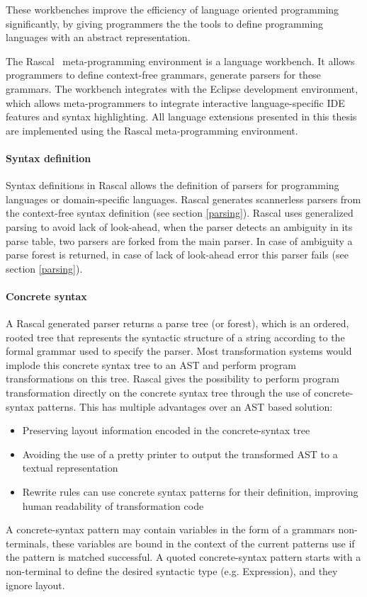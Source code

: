 These workbenches improve the efficiency of language oriented programming~\cite{Ward1994} significantly, by giving programmers the the tools to define programming languages with an abstract representation.

The Rascal~\cite{Klinta} meta-programming environment is a language workbench. It allows programmers to define context-free grammars, generate parsers for these grammars. The workbench integrates with the Eclipse development environment, which allows meta-programmers to integrate interactive language-specific IDE features and syntax highlighting. All language extensions presented in this thesis are implemented using the Rascal meta-programming environment.

\paragraph{Syntax definition}
Syntax definitions in Rascal allows the definition of parsers for programming languages or domain-specific languages. Rascal generates scannerless parsers from the context-free syntax definition (see section \ref{parsing}). Rascal uses generalized parsing to avoid lack of look-ahead, when the parser detects an ambiguity in its parse table, two parsers are forked from the main parser. In case of ambiguity a parse forest is returned, in case of lack of look-ahead error this parser fails (see section \ref{parsing}).

\paragraph{Concrete syntax}
A Rascal generated parser returns a parse tree (or forest), which is an ordered, rooted tree that represents the syntactic structure of a string according to the formal grammar used to specify the parser. Most transformation systems would implode this concrete syntax tree to an AST and perform program transformations on this tree. Rascal gives the possibility to perform program transformation directly on the concrete syntax tree through the use of concrete-syntax patterns. This has multiple advantages over an AST based solution:
\begin{itemize}
	\item Preserving layout information encoded in the concrete-syntax tree
	\item Avoiding the use of a pretty printer to output the transformed AST to a textual representation
	\item Rewrite rules can use concrete syntax patterns for their definition, improving human readability of transformation code
\end{itemize}
A concrete-syntax pattern may contain variables in the form of a grammars non-terminals, these variables are bound in the context of the current patterns use if the pattern is matched successful. A quoted concrete-syntax pattern starts with a non-terminal to define the desired syntactic type (e.g. Expression), and they ignore layout.

